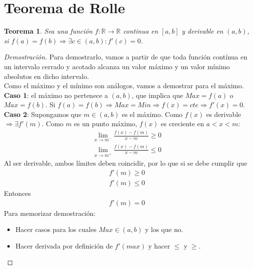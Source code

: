 \documentclass{article}
\newtheorem{rolle}{Teorema}
\begin{document}
\section{Teorema de Rolle}
\begin{rolle}
    Sea una función $f: \mathbb{R} \to \mathbb{R}$ continua en $[a,b]$ y derivable en $(a,b)$, si
    $f(a)=f(b)\Rightarrow \exists c \in (a,b): f'(c)=0$. 
\end{rolle}
\begin{proof}[Demostración]
    Para demostrarlo, vamos a partir de que toda función contínua en un intervalo cerrado y acotado
    alcanza un valor máximo y un valor mínimo absolutos en dicho intervalo.\\
    Como el máximo y el mínimo son análogos, vamos a demostrar para el máximo.\\
    \textbf{Caso 1}: el máximo no pertenece a $(a,b)$, que implica que $Max=f(a)$ o $Max=f(b)$. Si
    $f(a)=f(b)\Rightarrow Max=Min \Rightarrow f(x)=cte\Rightarrow f'(x)=0$.
    \textbf{Caso 2}: Supongamos que $m\in (a,b)$ es el máximo. Como $f(x)$ es derivable $\Rightarrow \exists f'(m)$.
    Como $m$ es un punto máximo, $f(x)$ es creciente en $a<x<m$:
    \begin{equation}
        \begin{split}
            \lim_{x \to m^-} \frac{f(x)-f(m)}{x-m}\geq 0\\
            \lim_{x \to m^+} \frac{f(x)-f(m)}{x-m}\leq 0
        \end{split}
    \end{equation}
    Al ser derivable, ambos límites deben coincidir, por lo que si se debe cumplir que
    \begin{equation}
        \begin{split}
            f'(m)\geq 0\\
            f'(m)\leq 0
        \end{split}
    \end{equation}
    Entonces
    \begin{equation}
        \begin{split}
            f'(m)=0
        \end{split}
    \end{equation}
Para memorizar demostración:
\begin{itemize}
	\item Hacer casos para los cuales \(Max \in (a,b)\) y los que no.
	\item Hacer derivada por definición de \(f'(max)\) y hacer \(\leq\) y \(\geq\).  
\end{itemize}
\end{proof}
\end{document}
